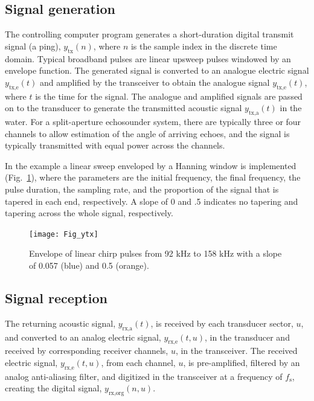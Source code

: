 \documentclass[preprint,12pt,TurnOnLineNumbers]{JASAnew}
\newcommand{\timesym}{t}
\newcommand{\samplesymt}{n}
\newcommand{\channelsym}{u}
\newcommand{\fs}{f_{\textrm{s}}}
\newcommand{\ytxe}{y_{\textrm{tx,e}}}
\newcommand{\ytxa}{y_{\textrm{tx,a}}}
\newcommand{\yrxa}{y_{\textrm{rx,a}}}
\newcommand{\yrxe}{y_{\textrm{rx,e}}}
\newcommand{\ytx}{y_{\textrm{tx}}}
\newcommand{\yrxorg}{y_{\textrm{rx,org}}}
\begin{document}
\subsection{Signal generation}

The controlling computer program generates a short-duration digital transmit signal (a ping), $\ytx(\samplesymt)$, where $\samplesymt$ is the sample index in the discrete time domain. Typical broadband pulses are linear upsweep pulses windowed by an envelope function. The generated signal is converted to an analogue electric signal $\ytxe(\timesym)$ and amplified by the transceiver to obtain the analogue signal $\ytxe(\timesym)$, where $\timesym$ is the time for the signal. The analogue and amplified signals are passed on to the transducer to generate the transmitted acoustic signal $\ytxa(\timesym)$ in the water. For a split-aperture echosounder system, there are typically three or four channels to allow estimation of the angle of arriving echoes, and the signal is typically transmitted with equal power across the channels.

In the example a linear sweep enveloped by a Hanning window is implemented (Fig.~\ref{fi:ytx}), where the parameters are the initial frequency, the final frequency, the pulse duration, the sampling rate, and the proportion of the signal that is tapered in each end, respectively. A slope of 0 and .5 indicates no tapering and tapering across the whole signal, respectively.
\begin{figure}
\texttt{[image: Fig\_ytx]}
\caption{\label{fi:ytx} Envelope of linear chirp pulses from 92 kHz to 158 kHz with a slope of 0.057 (blue) and 0.5 (orange).}
\end{figure}

\subsection{Signal reception}

The returning acoustic signal, $\yrxa(\timesym)$, is received by each transducer sector, $\channelsym$, and converted to an analog electric signal, $\yrxe(\timesym,\channelsym)$, in the transducer and received by corresponding receiver channels, $\channelsym$, in the transceiver. The received electric signal, $\yrxe(\timesym,\channelsym)$, from each channel, $\channelsym$, is pre-amplified, filtered by an analog anti-aliasing filter, and digitized in the transceiver at a frequency of $\fs$, creating the digital signal, $\yrxorg(\samplesymt,\channelsym)$.
\end{document}

